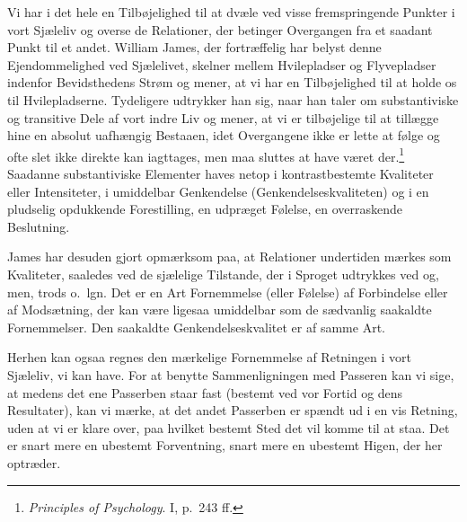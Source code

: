 \documentclass[12pt]{article}
\newcommand{\opage}[1]{\marginnote{\footnotesize\textit{[#1]}}}
\begin{document}
Vi har i det hele en Tilbøjelighed til at dvæle ved visse fremspringende Punkter
i vort Sjæleliv og overse de Relationer, der betinger Overgangen fra et saadant
Punkt til et andet. William James, der fortræffelig har belyst denne
Ejendommelighed ved Sjælelivet, skelner mellem Hvilepladser og Flyvepladser
indenfor Bevidsthedens Strøm og
\opage{22} \setcounter{footnote}{0}%
mener, at vi har en Tilbøjelighed til at holde os til Hvilepladserne. Tydeligere
udtrykker han sig, naar han taler om substantiviske og transitive Dele af vort
indre Liv og mener, at vi er tilbøjelige til at tillægge hine en absolut
uafhængig Bestaaen, idet Overgangene ikke er lette at følge og ofte slet ikke
direkte kan iagttages, men maa sluttes at have været
der.\footnote{\textit{Principles of Psychology}. I, p.~243 ff.} Saadanne
substantiviske Elementer haves netop i kontrastbestemte Kvaliteter eller
Intensiteter, i umiddelbar Genkendelse (Genkendelseskvaliteten) og i en
pludselig opdukkende Forestilling, en udpræget Følelse, en overraskende
Beslutning.

James har desuden gjort opmærksom paa, at Relationer undertiden mærkes som
Kvaliteter, saaledes ved de sjælelige Tilstande, der i Sproget udtrykkes ved
\guillemotright{}og\guillemotleft{}, \guillemotright{}men\guillemotleft{},
\guillemotright{}trods\guillemotleft{} o.\ lgn. Det er en Art Fornemmelse (eller
Følelse) af Forbindelse eller af Modsætning, der kan være ligesaa umiddelbar som
de sædvanlig saakaldte Fornemmelser. Den saakaldte Genkendelseskvalitet er af
samme Art.

Herhen kan ogsaa regnes den mærkelige Fornemmelse af Retningen i vort Sjæleliv,
vi kan have. For at benytte Sammenligningen med Passeren kan vi sige, at medens
det ene Passerben staar fast (bestemt ved vor Fortid og dens Resultater), kan vi
mærke, at det andet Passerben er spændt ud i en vis Retning, uden at vi er klare
over, paa hvilket bestemt Sted det vil komme til at staa. Det er snart mere en
ubestemt Forventning, snart mere en ubestemt Higen, der her optræder.
\end{document}
